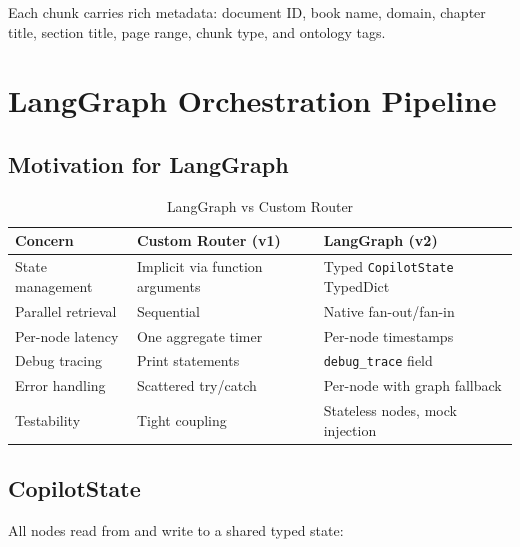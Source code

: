 \documentclass[12pt,a4paper]{report}
\begin{document}
Each chunk carries rich metadata: document ID, book name, domain, chapter title, section title, page range, chunk type, and ontology tags.

\chapter{LangGraph Orchestration Pipeline}

\section{Motivation for LangGraph}

\begin{table}[H]
\centering
\caption{LangGraph vs Custom Router}
\begin{tabularx}{\textwidth}{@{}lXX@{}}
\toprule
\textbf{Concern} & \textbf{Custom Router (v1)} & \textbf{LangGraph (v2)} \\
\midrule
State management & Implicit via function arguments & Typed \texttt{CopilotState} TypedDict \\
Parallel retrieval & Sequential & Native fan-out/fan-in \\
Per-node latency & One aggregate timer & Per-node timestamps \\
Debug tracing & Print statements & \texttt{debug\_trace} field \\
Error handling & Scattered try/catch & Per-node with graph fallback \\
Testability & Tight coupling & Stateless nodes, mock injection \\
\bottomrule
\end{tabularx}
\end{table}

\section{CopilotState}

All nodes read from and write to a shared typed state:
\end{document}
